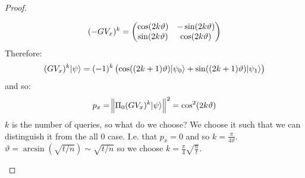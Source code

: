 \begin{proof}
\begin{enumerate}
        \begin{equation}
            (-GV_x)^k = \begin{pmatrix}\cos(2k\vartheta) & -\sin(2k\vartheta) \\ \sin(2k\vartheta) & \cos(2k\vartheta)\end{pmatrix}
        \end{equation}
        Therefore:
        \begin{equation}
            (GV_x)^k\lvert \psi \rangle = (-1)^k\left(\cos((2k+1)\vartheta)\lvert \psi_0 \rangle + \sin((2k+1)\vartheta)\lvert \psi_1 \rangle\right)
        \end{equation}
        and so:
        \begin{equation}
            p_x = \norm{\Pi_0(GV_x)^k\lvert \psi \rangle}^2 = \cos^2(2k\vartheta)
        \end{equation}
        $k$ is the number of queries, so what do we choose? We choose it such that we can distinguish it from the all $0$ case. I.e. that $p_x = 0$ and so $k = \frac{\pi}{4\vartheta}$. $\vartheta = \arcsin(\sqrt{t/n}) \sim \sqrt{t/n}$ so we choose $k = \frac{\pi}{4}\sqrt{\frac{n}{t}}$. 
    \end{enumerate}
\end{proof}